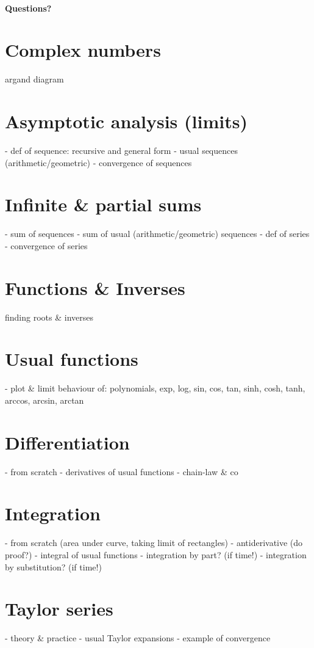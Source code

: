 \documentclass[11pt,a4paper]{article}
\begin{document}
\paragraph{Questions?}
\newpage



\section{Complex numbers}
argand diagram

\section{Asymptotic analysis (limits)}
- def of sequence: recursive and general form
- usual sequences (arithmetic/geometric)
- convergence of sequences
\section{Infinite \& partial sums}
- sum of sequences
- sum of usual (arithmetic/geometric) sequences
- def of series
- convergence of series

\section{Functions \& Inverses}
finding roots \& inverses
\section{Usual functions}
- plot \& limit behaviour of: polynomials, exp, log, sin, cos, tan, sinh, cosh, tanh, arccos, arcsin, arctan
\section{Differentiation}
- from scratch
- derivatives of usual functions
- chain-law \& co

\section{Integration}
- from scratch (area under curve, taking limit of rectangles)
- antiderivative (do proof?)
- integral of usual functions
- integration by part? (if time!)
- integration by substitution? (if time!)
\section{Taylor series}
- theory \& practice
- usual Taylor expansions
- example of convergence
\end{document}
